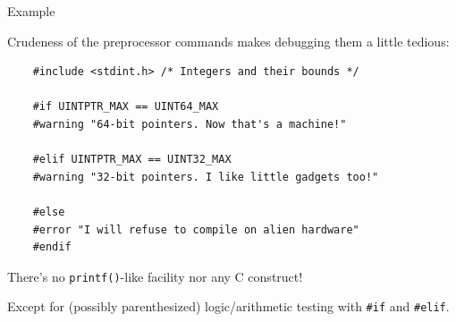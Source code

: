 \begin{frame}[fragile]{Example}

  Crudeness of the preprocessor commands makes debugging them a little tedious:

  \begin{lstlisting}
    #include <stdint.h> /* Integers and their bounds */

    #if UINTPTR_MAX == UINT64_MAX
    #warning "64-bit pointers. Now that's a machine!"

    #elif UINTPTR_MAX == UINT32_MAX
    #warning "32-bit pointers. I like little gadgets too!"

    #else
    #error "I will refuse to compile on alien hardware"
    #endif
  \end{lstlisting}

  There's no \lstinline{printf()}-like facility nor any C construct!

  Except for (possibly parenthesized) logic/arithmetic testing with \lstinline{#if} and \lstinline{#elif}.

\end{frame}

